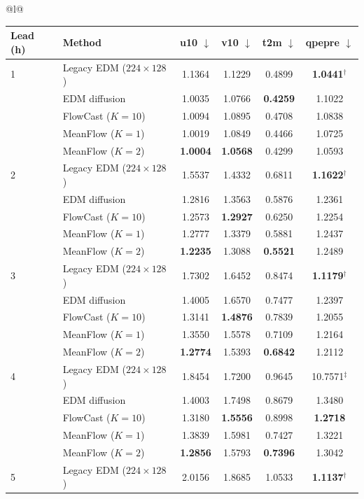 \documentclass[border=10pt]{standalone}
\begin{document}
\begin{tabular}{@{}l@{}}
\begin{tabular}{llcccc}
\toprule
Lead (h) & Method & u10 $\downarrow$ & v10 $\downarrow$ & t2m $\downarrow$ & qpepre $\downarrow$ \\
\midrule
1 & Legacy EDM ($224{\times}128$) & 1.1364 & 1.1229 & 0.4899 & \textbf{1.0441}$^\dagger$ \\
 & EDM diffusion & 1.0035 & 1.0766 & \textbf{0.4259} & 1.1022 \\
 & FlowCast ($K{=}10$) & 1.0094 & 1.0895 & 0.4708 & 1.0838 \\
 & MeanFlow ($K{=}1$) & 1.0019 & 1.0849 & 0.4466 & 1.0725 \\
 & MeanFlow ($K{=}2$) & \textbf{1.0004} & \textbf{1.0568} & 0.4299 & 1.0593 \\
\midrule
2 & Legacy EDM ($224{\times}128$) & 1.5537 & 1.4332 & 0.6811 & \textbf{1.1622}$^\dagger$ \\
 & EDM diffusion & 1.2816 & 1.3563 & 0.5876 & 1.2361 \\
 & FlowCast ($K{=}10$) & 1.2573 & \textbf{1.2927} & 0.6250 & 1.2254 \\
 & MeanFlow ($K{=}1$) & 1.2777 & 1.3379 & 0.5881 & 1.2437 \\
 & MeanFlow ($K{=}2$) & \textbf{1.2235} & 1.3088 & \textbf{0.5521} & 1.2489 \\
\midrule
3 & Legacy EDM ($224{\times}128$) & 1.7302 & 1.6452 & 0.8474 & \textbf{1.1179}$^\dagger$ \\
 & EDM diffusion & 1.4005 & 1.6570 & 0.7477 & 1.2397 \\
 & FlowCast ($K{=}10$) & 1.3141 & \textbf{1.4876} & 0.7839 & 1.2055 \\
 & MeanFlow ($K{=}1$) & 1.3550 & 1.5578 & 0.7109 & 1.2164 \\
 & MeanFlow ($K{=}2$) & \textbf{1.2774} & 1.5393 & \textbf{0.6842} & 1.2112 \\
\midrule
4 & Legacy EDM ($224{\times}128$) & 1.8454 & 1.7200 & 0.9645 & 10.7571$^\ddagger$ \\
 & EDM diffusion & 1.4003 & 1.7498 & 0.8679 & 1.3480 \\
 & FlowCast ($K{=}10$) & 1.3180 & \textbf{1.5556} & 0.8998 & \textbf{1.2718} \\
 & MeanFlow ($K{=}1$) & 1.3839 & 1.5981 & 0.7427 & 1.3221 \\
 & MeanFlow ($K{=}2$) & \textbf{1.2856} & 1.5793 & \textbf{0.7396} & 1.3042 \\
\midrule
5 & Legacy EDM ($224{\times}128$) & 2.0156 & 1.8685 & 1.0533 & \textbf{1.1137}$^\dagger$ \\

\end{tabular}
\end{tabular}
\end{document}
